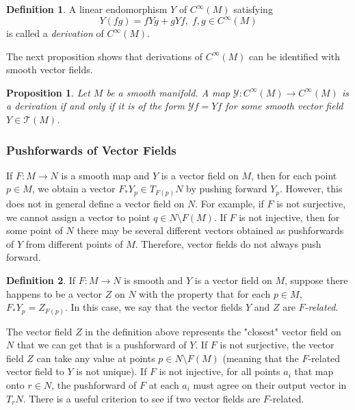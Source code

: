 \documentclass{article}
\newtheorem{proposition}[theorem]{Proposition}
\theoremstyle{remark}
\theoremstyle{definition}
\newtheorem{definition}{Definition}[section]
\begin{document}
\begin{definition}
A linear endomorphism $Y$ of $C^\infty (M)$ satisfying 
\[Y(f g) = f Y g + g Y f, \; f, g \in C^\infty(M)\]
is called a \textit{derivation} of $C^\infty (M)$. 
\end{definition}

The next proposition shows that derivations of $C^\infty (M)$ can be identified with smooth vector fields. 

\begin{proposition}
Let $M$ be a smooth manifold. A map $\mathcal{Y}: C^\infty (M) \longrightarrow C^\infty (M)$ is a derivation if and only if it is of the form $\mathcal{Y} f = Y f$ for some smooth vector field $Y \in \mathcal{T}(M)$. 
\end{proposition}

\subsubsection{Pushforwards of Vector Fields}
If $F: M \longrightarrow N$ is a smooth map and $Y$ is a vector field on $M$, then for each point $p \in M$, we obtain a vector $F_* Y_p \in T_{F(p)} N$ by pushing forward $Y_p$. However, this does not in general define a vector field on $N$. For example, if $F$ is not surjective, we cannot assign a vector to point $q \in N \setminus F(M)$. If $F$ is not injective, then for some point of $N$ there may be several different vectors obtained as pushforwards of $Y$ from different points of $M$. Therefore, vector fields do not always push forward. 

\begin{definition}
If $F: M \longrightarrow N$ is smooth and $Y$ is a vector field on $M$, suppose there happens to be a vector $Z$ on $N$ with the property that for each $p \in M$, $F_* Y_p = Z_{F(p)}$. In this case, we say that the vector fields $Y$ and $Z$ are \textit{$F$-related}. 
\end{definition}

The vector field $Z$ in the definition above represents the "closest" vector field on $N$ that we can get that is a pushforward of $Y$. If $F$ is not surjective, the vector field $Z$ can take any value at points $p \in N \setminus F(M)$ (meaning that the $F$-related vector field to $Y$ is not unique). If $F$ is not injective, for all points $a_i$ that map onto $r \in N$, the pushforward of $F$ at each $a_i$ must agree on their output vector in $T_r N$. There is a useful criterion to see if two vector fields are $F$-related. 
\end{document}
